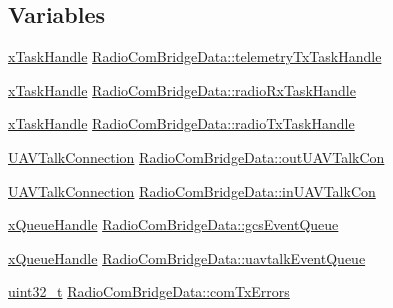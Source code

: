 \subsection*{Variables}
\begin{DoxyCompactItemize}
\item 
\hyperlink{_common_2_libraries_2_free_r_t_o_s_2_source_2include_2task_8h_a271ae40d5db07d928a113766505a0965}{x\-Task\-Handle} \hyperlink{group___radio_com_bridge_module_ga189160ac3985d53d095bce400a1a7a5f}{Radio\-Com\-Bridge\-Data\-::telemetry\-Tx\-Task\-Handle}
\item 
\hyperlink{_common_2_libraries_2_free_r_t_o_s_2_source_2include_2task_8h_a271ae40d5db07d928a113766505a0965}{x\-Task\-Handle} \hyperlink{group___radio_com_bridge_module_ga4c820a9e2bc40a76c43488fa46c8483e}{Radio\-Com\-Bridge\-Data\-::radio\-Rx\-Task\-Handle}
\item 
\hyperlink{_common_2_libraries_2_free_r_t_o_s_2_source_2include_2task_8h_a271ae40d5db07d928a113766505a0965}{x\-Task\-Handle} \hyperlink{group___radio_com_bridge_module_gaf39b9a5475db119fb3e7502f1c73ac16}{Radio\-Com\-Bridge\-Data\-::radio\-Tx\-Task\-Handle}
\item 
\hyperlink{group___open_pilot_libraries_gaeff1721eaebd4ab306057b4017f23f36}{U\-A\-V\-Talk\-Connection} \hyperlink{group___radio_com_bridge_module_gafd3b3b69c1cdea1fed445a0c2fd40319}{Radio\-Com\-Bridge\-Data\-::out\-U\-A\-V\-Talk\-Con}
\item 
\hyperlink{group___open_pilot_libraries_gaeff1721eaebd4ab306057b4017f23f36}{U\-A\-V\-Talk\-Connection} \hyperlink{group___radio_com_bridge_module_gaf682c724d4e325caaccb297cc349911d}{Radio\-Com\-Bridge\-Data\-::in\-U\-A\-V\-Talk\-Con}
\item 
\hyperlink{_common_2_libraries_2_free_r_t_o_s_2_source_2include_2queue_8h_a229037f755b756156e34a440ce134b8b}{x\-Queue\-Handle} \hyperlink{group___radio_com_bridge_module_gaacd7e5ae2cc543712ed4902c62ea4114}{Radio\-Com\-Bridge\-Data\-::gcs\-Event\-Queue}
\item 
\hyperlink{_common_2_libraries_2_free_r_t_o_s_2_source_2include_2queue_8h_a229037f755b756156e34a440ce134b8b}{x\-Queue\-Handle} \hyperlink{group___radio_com_bridge_module_gadf0a6424f27b6767c1633071f3867154}{Radio\-Com\-Bridge\-Data\-::uavtalk\-Event\-Queue}
\item 
\hyperlink{stdint_8h_a435d1572bf3f880d55459d9805097f62}{uint32\-\_\-t} \hyperlink{group___radio_com_bridge_module_ga70614241d844e1b9501d0ba2fee0d2a3}{Radio\-Com\-Bridge\-Data\-::com\-Tx\-Errors}
\item 

\end{DoxyCompactItemize}
